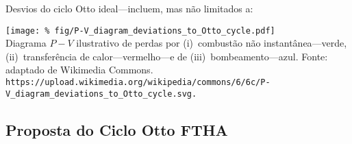     \begin{frame}{Desvios do ciclo Otto ideal---incluem, mas não limitados a:}\vspace*{-2em}
        \begin{center}
            \texttt{[image: \%
                fig/P-V\_diagram\_deviations\_to\_Otto\_cycle.pdf]}\\
            \footnotesize  Diagrama  $P-V$  ilustrativo  de   perdas   por   (i)~combustão   não
                instantânea---verde,    (ii)~transferência    de     calor---vermelho---e     de
                (iii)~bombeamento---azul. Fonte: adaptado de Wikimedia Commons.
            {\tiny\tt https://upload.wikimedia.org/wikipedia/commons/6/6c/P-V\_diagram\_deviations\_to\_Otto\_cycle.svg.}
        \end{center}
    \end{frame}

\subsection{Proposta do Ciclo Otto FTHA}

